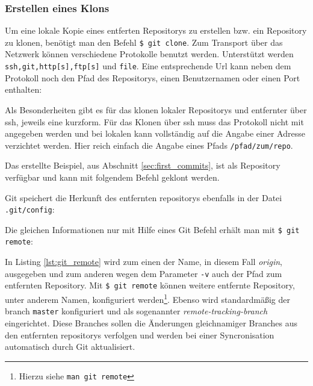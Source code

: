 \subsubsection{Erstellen eines Klons}
Um eine lokale Kopie eines entferten Repositorys zu erstellen bzw. ein
Repository zu klonen, benötigt man den Befehl \texttt{\$ git clone}. Zum
Transport über das Netzwerk können verschiedene Protokolle benutzt werden.
Unterstützt werden \texttt{ssh,git,http[s],ftp[s]} und \texttt{file}. Eine
entsprechende Url kann neben dem Protokoll noch den Pfad des Repositorys, einen
Benutzernamen oder einen Port enthalten:



Als Besonderheiten gibt es für das klonen lokaler Repositorys und entfernter
über \gls{ssh}, jeweils eine kurzform. Für das Klonen über \gls{ssh} muss das
Protokoll nicht mit angegeben werden und bei lokalen kann vollständig auf die
Angabe einer Adresse verzichtet werden. Hier reich einfach die Angabe eines
Pfads \texttt{/pfad/zum/repo}.

Das erstellte Beispiel, aus Abschnitt \ref{sec:first_commits}, ist als
Repository verfügbar und kann mit folgendem Befehl geklont werden.



Git speichert die Herkunft des entfernten \glspl{repository} ebenfalls in der
Datei \texttt{.git/config}:



Die gleichen Informationen nur mit Hilfe eines Git Befehl erhält man mit
\texttt{\$ git remote}:



In Listing \ref{lst:git_remote} wird zum einen der Name, in diesem Fall
\textit{origin}, ausgegeben und zum anderen wegen dem Parameter \texttt{-v}
auch der Pfad zum entfernten Repository. Mit \texttt{\$ git remote} können
weitere entfernte Repository, unter anderem Namen, konfiguriert
werden\footnote{Hierzu siehe \texttt{man git remote}}. Ebenso wird
standardmäßig der \gls{branch} \texttt{master} konfiguriert und als sogenannter
\textit{remote-tracking-branch} eingerichtet. Diese Branches sollen die
Änderungen gleichnamiger Branches aus den entfernten \glspl{repository}
verfolgen und werden bei einer Syncronisation automatisch durch Git
aktualisiert.\cite[S.~141-143]{gitosp}

